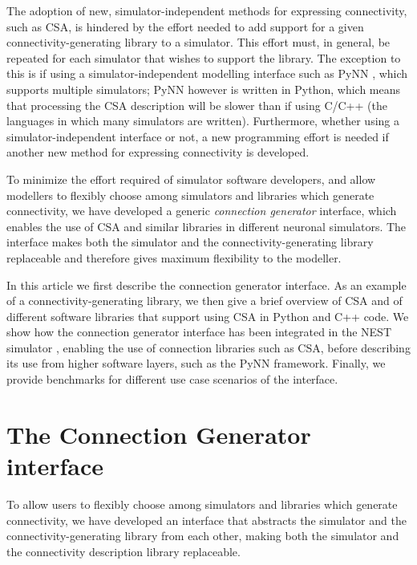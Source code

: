 \documentclass{frontiersSCNS} %
\begin{document}
The adoption of new, simulator-independent methods for expressing
connectivity, such as CSA, is hindered by the effort needed to add
support for a given connectivity-generating library to a simulator.
This effort must, in general, be repeated for each simulator that
wishes to support the library.  The exception to this is if using a
simulator-independent modelling interface such as PyNN
\citep[\url{http://www.neuralensemble.org/PyNN};][]{Davison09}, which
supports multiple simulators; PyNN however is written in Python, which
means that processing the CSA description will be slower than if using
C/C++ (the languages in which many simulators are written).
Furthermore, whether using a simulator-independent interface or not, a
new programming effort is needed if another new method for expressing
connectivity is developed.

To minimize the effort required of simulator software developers, and
allow modellers to flexibly choose among simulators and libraries
which generate connectivity, we have developed a generic
\emph{connection generator} interface, which enables the use of CSA
and similar libraries in different neuronal simulators.  The interface
makes both the simulator and the connectivity-generating library
replaceable and therefore gives maximum flexibility to the modeller.

In this article we first describe the connection generator interface.
As an example of a connectivity-generating library, we then give a
brief overview of CSA and of different software libraries that support
using CSA in Python and C++ code. We show how the connection generator
interface has been integrated in the NEST simulator
\citep[\url{http://www.nest-simulator.org};][]{Gewaltig_07_11204},
enabling the use of connection libraries such as CSA, before
describing its use from higher software layers, such as the PyNN
framework.  Finally, we provide benchmarks for different use case
scenarios of the interface.


\section{The Connection Generator interface}\label{sec:conn_gen}

To allow users to flexibly choose among simulators and libraries which
generate connectivity, we have developed an interface that abstracts the
simulator and the connectivity-generating library from each other,
making both the simulator and the connectivity description library
replaceable.
\end{document}
